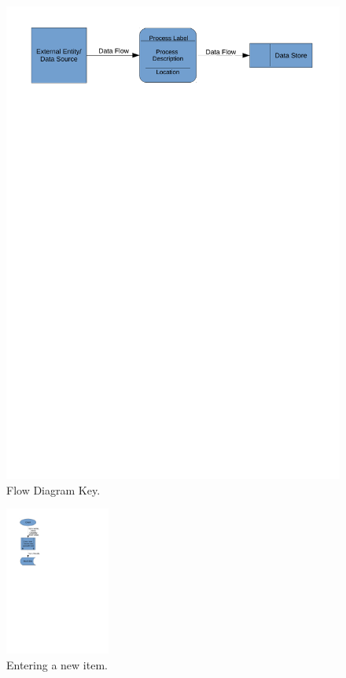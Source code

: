 \begin{figure}[H]
    \includegraphics[width=\textwidth]{./Analysis/Dataflow/DFD_analysis_key.pdf}
    \caption{Flow Diagram Key.} \label{fig:print_function_result}
\end{figure}

\begin{figure}[H]
    \centerline{\includegraphics[width=130px]{./Analysis/Dataflow/DFD_analysis_new_item.pdf}}
    \caption{Entering a new item.} \label{fig:print_function_result}
\end{figure}

